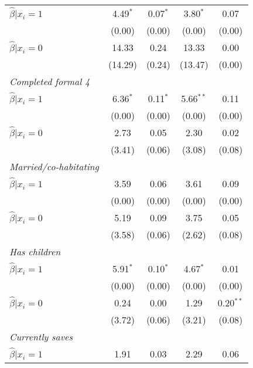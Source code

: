 \begin{table}[htbp]
{\begin{threeparttable}
\begin{tabular}{l*{4}{c}}
\hspace{0.5cm} \(\hat\beta|x_i=1\)&4.49$^{*}$&0.07$^{*}$&3.80$^{*}$&     0.07\\
                &   (0.00)&   (0.00)&   (0.00)&   (0.00)\\
\hspace{0.5cm} \(\hat\beta|x_i=0\)&    14.33&     0.24&    13.33&     0.00\\
                &  (14.29)&   (0.24)&  (13.47)&   (0.00)\\
\textit{Completed formal 4}&         &         &         &         \\
\hspace{0.5cm} \(\hat\beta|x_i=1\)&6.36$^{*}$&0.11$^{*}$&5.66$^{**}$&     0.11\\
                &   (0.00)&   (0.00)&   (0.00)&   (0.00)\\
\hspace{0.5cm} \(\hat\beta|x_i=0\)&     2.73&     0.05&     2.30&     0.02\\
                &   (3.41)&   (0.06)&   (3.08)&   (0.08)\\
\textit{Married/co-habitating}&         &         &         &         \\
\hspace{0.5cm} \(\hat\beta|x_i=1\)&     3.59&     0.06&     3.61&     0.09\\
                &   (0.00)&   (0.00)&   (0.00)&   (0.00)\\
\hspace{0.5cm} \(\hat\beta|x_i=0\)&     5.19&     0.09&     3.75&     0.05\\
                &   (3.58)&   (0.06)&   (2.62)&   (0.08)\\
\textit{Has children}&         &         &         &         \\
\hspace{0.5cm} \(\hat\beta|x_i=1\)&5.91$^{*}$&0.10$^{*}$&4.67$^{*}$&     0.01\\
                &   (0.00)&   (0.00)&   (0.00)&   (0.00)\\
\hspace{0.5cm} \(\hat\beta|x_i=0\)&     0.24&     0.00&     1.29&0.20$^{**}$\\
                &   (3.72)&   (0.06)&   (3.21)&   (0.08)\\
\textit{Currently saves}&         &         &         &         \\
\hspace{0.5cm} \(\hat\beta|x_i=1\)&     1.91&     0.03&     2.29&     0.06\\

\end{tabular}
\end{threeparttable}}
\end{table}
